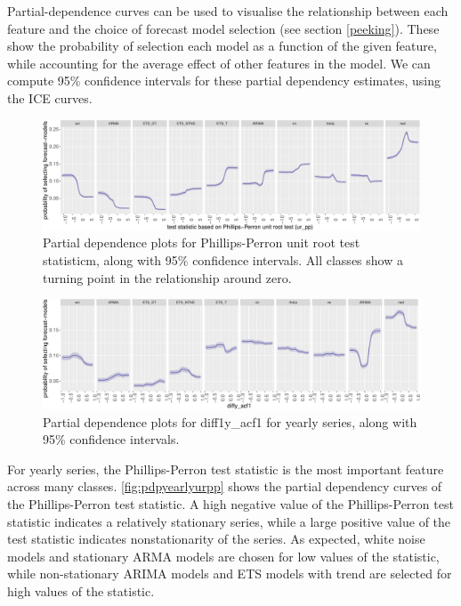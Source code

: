 \documentclass[11pt,a4paper,]{article}
\begin{document}
Partial-dependence curves can be used to visualise the relationship between each feature and the choice of forecast model selection (see section \autoref{peeking}). These show the probability of selection each model as a function of the given feature, while accounting for the average effect of other features in the model. We can compute 95\% confidence intervals for these partial dependency estimates, using the ICE curves.

\begin{figure}[!b]

{\centering \includegraphics[width=\textwidth]{figure/pdpyearlyurpp-1} 

}

\caption{Partial dependence plots for Phillips-Perron unit root test statisticm, along with 95\% confidence intervals. All classes show a turning point in the relationship around zero.}\label{fig:pdpyearlyurpp}
\end{figure}

\begin{figure}[!b]

{\centering \includegraphics[width=\textwidth]{figure/diff1yacf1y-1} 

}

\caption{Partial dependence plots for diff1y\_acf1 for yearly series, along with 95\% confidence intervals.}\label{fig:diff1yacf1y}
\end{figure}

For yearly series, the Phillips-Perron test statistic is the most important feature across many classes. \autoref{fig:pdpyearlyurpp} shows the partial dependency curves of the Phillips-Perron test statistic. A high negative value of the Phillips-Perron test statistic indicates a relatively stationary series, while a large positive value of the test statistic indicates nonstationarity of the series. As expected, white noise models and stationary ARMA models are chosen for low values of the statistic, while non-stationary ARIMA models and ETS models with trend are selected for high values of the statistic.
\end{document}
